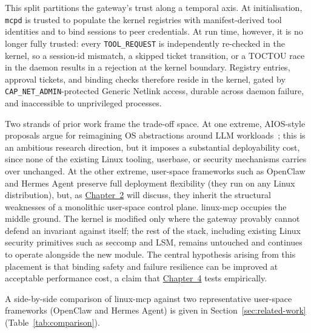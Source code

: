This split partitions the gateway's trust along a temporal axis.
At initialisation, \texttt{mcpd} is trusted to populate the kernel registries with manifest-derived tool identities and to bind sessions to peer credentials.
At run time, however, it is no longer fully trusted: every \texttt{TOOL\_\allowbreak REQUEST} is independently re-checked in the kernel, so a session-id mismatch, a skipped ticket transition, or a TOCTOU race in the daemon results in a rejection at the kernel boundary.
Registry entries, approval tickets, and binding checks therefore reside in the kernel, gated by \texttt{CAP\_\allowbreak NET\_\allowbreak ADMIN}-protected Generic Netlink access, durable across daemon failure, and inaccessible to unprivileged processes.

Two strands of prior work frame the trade-off space.
At one extreme, AIOS-style proposals argue for reimagining OS abstractions around LLM workloads~\cite{mei2024aios}; this is an ambitious research direction, but it imposes a substantial deployability cost, since none of the existing Linux tooling, userbase, or security mechanisms carries over unchanged.
At the other extreme, user-space frameworks such as OpenClaw and Hermes Agent preserve full deployment flexibility (they run on any Linux distribution), but, as \hyperref[chap:background]{Chapter~2} will discuss, they inherit the structural weaknesses of a monolithic user-space control plane.
linux-mcp occupies the middle ground.
The kernel is modified only where the gateway provably cannot defend an invariant against itself; the rest of the stack, including existing Linux security primitives such as seccomp and LSM, remains untouched and continues to operate alongside the new module.
The central hypothesis arising from this placement is that binding safety and failure resilience can be improved at acceptable performance cost, a claim that \hyperref[chap:evaluation]{Chapter~4} tests empirically.

A side-by-side comparison of linux-mcp against two representative user-space frameworks (OpenClaw and Hermes Agent) is given in Section~\ref{sec:related-work} (Table~\ref{tab:comparison}).

